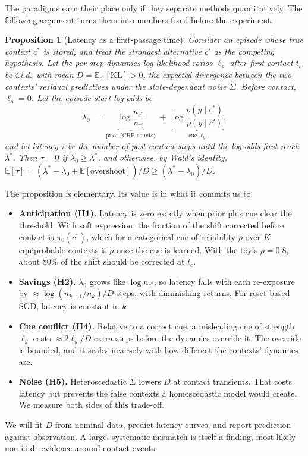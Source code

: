 \documentclass[10pt]{article}
\newtheorem{proposition}{Proposition}
\newcommand{\E}{\mathbb{E}}
\begin{document}
The paradigms earn their place only if they separate methods quantitatively. The following
argument turns them into numbers fixed before the experiment.

\begin{proposition}[Latency as a first-passage time]\label{prop:latency}
Consider an episode whose true context $c^\ast$ is stored, and treat the strongest alternative $c'$ as
the competing hypothesis. Let the per-step dynamics log-likelihood ratios $\ell_s$ after first contact
$t_c$ be i.i.d.\ with mean $D=\E_{c^\ast}[\mathrm{KL}]>0$, the expected divergence between the two
contexts' residual predictives under the state-dependent noise $\Sigma$. Before contact,
$\ell_s=0$. Let the episode-start log-odds be
\[
  \lambda_0 \;=\; \underbrace{\log\frac{n_{c^\ast}}{n_{c'}}}_{\text{prior (CRP counts)}}
  \;+\;\underbrace{\log\frac{p(y\mid c^\ast)}{p(y\mid c')}}_{\text{cue, }\ell_y},
\]
and let latency $\tau$ be the number of post-contact steps until the log-odds first reach
$\lambda^\ast$. Then $\tau=0$ if $\lambda_0\ge\lambda^\ast$, and otherwise, by Wald's identity,
$\E[\tau]=(\lambda^\ast-\lambda_0+\E[\text{overshoot}])/D\ge(\lambda^\ast-\lambda_0)/D$.
\end{proposition}

The proposition is elementary. Its value is in what it commits us to.
\begin{itemize}
  \item \textbf{Anticipation (H1).} Latency is zero exactly when prior plus cue clear the threshold.
  With soft expression, the fraction of the shift corrected before contact is $\pi_0(c^\ast)$, which
  for a categorical cue of reliability $\rho$ over $K$ equiprobable contexts is $\rho$ once the cue is
  learned. With the toy's $\rho=0.8$, about 80\% of the shift should be corrected at $t_c$.
  \item \textbf{Savings (H2).} $\lambda_0$ grows like $\log n_{c^\ast}$, so latency falls with each
  re-exposure by $\approx\log(n_{k+1}/n_k)/D$ steps, with diminishing returns. For reset-based SGD,
  latency is constant in $k$.
  \item \textbf{Cue conflict (H4).} Relative to a correct cue, a misleading cue of strength $\ell_y$ costs
  $\approx 2\ell_y/D$ extra steps before the dynamics override it. The override is bounded, and it
  scales inversely with how different the contexts' dynamics are.
  \item \textbf{Noise (H5).} Heteroscedastic $\Sigma$ lowers $D$ at contact transients. That costs
  latency but prevents the false contexts a homoscedastic model would create. We measure both sides of
  this trade-off.
\end{itemize}
We will fit $D$ from nominal data, predict latency curves, and report prediction against observation.
A large, systematic mismatch is itself a finding, most likely non-i.i.d.\ evidence around contact
events.
\end{document}
